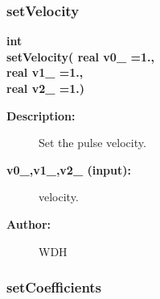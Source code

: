 \subsubsection{setVelocity}
 
\begin{flushleft} \textbf{%
int  \\ 
\settowidth{\OGPulseFunctionIncludeArgIndent}{setVelocity(}%
setVelocity( real v0\_   =1.,\\ 
\hspace{\OGPulseFunctionIncludeArgIndent}real v1\_   =1.,\\ 
\hspace{\OGPulseFunctionIncludeArgIndent}real v2\_   =1.)
}\end{flushleft}
\begin{description}
\item[{\bf Description:}] 
  Set the pulse velocity.
  
\item[{\bf v0\_,v1\_,v2\_ (input):}]  velocity.
 
\item[{\bf Author:}]  WDH
\end{description}
\subsubsection{setCoefficients}
 
